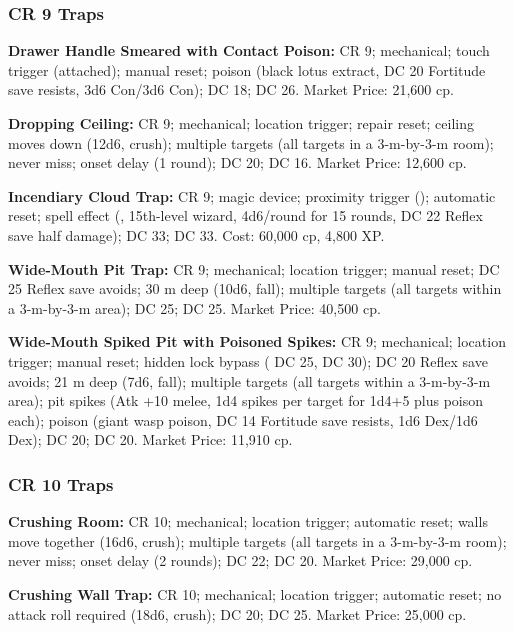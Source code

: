 \subsubsection{CR 9 Traps}
\textbf{Drawer Handle Smeared with Contact Poison:} CR 9; mechanical; touch trigger (attached); manual reset; poison (black lotus extract, DC 20 Fortitude save resists, 3d6 Con/3d6 Con);  DC 18;  DC 26. Market Price: 21,600 cp.

\textbf{Dropping Ceiling:} CR 9; mechanical; location trigger; repair reset; ceiling moves down (12d6, crush); multiple targets (all targets in a 3-m-by-3-m room); never miss; onset delay (1 round);  DC 20;  DC 16. Market Price: 12,600 cp.

\textbf{Incendiary Cloud Trap:} CR 9; magic device; proximity trigger (); automatic reset; spell effect (, 15th-level wizard, 4d6/round for 15 rounds, DC 22 Reflex save half damage);  DC 33;  DC 33. Cost: 60,000 cp, 4,800 XP.

\textbf{Wide-Mouth Pit Trap:} CR 9; mechanical; location trigger; manual reset; DC 25 Reflex save avoids; 30 m deep (10d6, fall); multiple targets (all targets within a 3-m-by-3-m area);  DC 25;  DC 25. Market Price: 40,500 cp.

\textbf{Wide-Mouth Spiked Pit with Poisoned Spikes:} CR 9; mechanical; location trigger; manual reset; hidden lock bypass ( DC 25,  DC 30); DC 20 Reflex save avoids; 21 m deep (7d6, fall); multiple targets (all targets within a 3-m-by-3-m area); pit spikes (Atk +10 melee, 1d4 spikes per target for 1d4+5 plus poison each); poison (giant wasp poison, DC 14 Fortitude save resists, 1d6 Dex/1d6 Dex);  DC 20;  DC 20. Market Price: 11,910 cp.

\subsubsection{CR 10 Traps}
\textbf{Crushing Room:} CR 10; mechanical; location trigger; automatic reset; walls move together (16d6, crush); multiple targets (all targets in a 3-m-by-3-m room); never miss; onset delay (2 rounds);  DC 22;  DC 20. Market Price: 29,000 cp.

\textbf{Crushing Wall Trap:} CR 10; mechanical; location trigger; automatic reset; no attack roll required (18d6, crush);  DC 20;  DC 25. Market Price: 25,000 cp.

